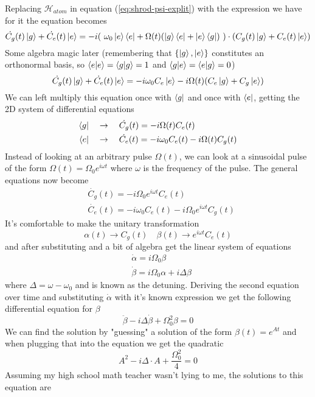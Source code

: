 Replacing $\mathcal{H}_{atom}$ in equation  (\ref{eq:shrod-psi-explit}) with the expression we have for it the equation becomes
\[
    \dot{C_g} (t) \ket{g} + \dot{C_e} (t) \ket{e} = -i  (\ \omega_0\ket{e}\bra{e} + \Omega (t) (\ket{g}\bra{e} + \ket{e}\bra{g})\ )\cdot  (C_g (t) \ket{g} + C_e (t) \ket{e})
\]
Some algebra magic later (remembering that $\{\ket{g},\ket{e}\}$ constitutes an orthonormal basis, so $\braket{e}{e} = \braket{g}{g} = 1$ and $\braket{g}{e} = \braket{e}{g} = 0$)
\[
    \dot{C_g} (t) \ket{g} + \dot{C_e} (t) \ket{e} = -i \omega_0 C_e \ket{e} - i\Omega (t) (C_e\ket{g} + C_g \ket{e})
\]
We can left multiply this equation once with $\bra{g}$ and once with $\bra{e}$, getting the 2D system of differential equations
\begin{align*}
    \bra{g} \quad &\rightarrow \quad \dot{C_g} (t) = -i \Omega (t)C_e (t) \\
    \bra{e} \quad &\rightarrow \quad \dot{C_e} (t) = -i \omega_0 C_e (t) - i\Omega (t) C_g (t)
\end{align*} 
Instead of looking at an arbitrary pulse $\Omega  (t)$, we can look at a sinusoidal pulse of the form $\Omega  (t) = \Omega_0 e^{i\omega t}$ where $\omega$ is the frequency of the pulse. The general equations now become
\begin{align*}
    &\dot{C_g} (t) = -i \Omega_0 e^{i\omega t}C_e (t) \\
    &\dot{C_e} (t) = -i \omega_0 C_e (t) - i \Omega_0 e^{i\omega t} C_g (t)
\end{align*}
It's comfortable to make the unitary transformation
\[
    \alpha (t) \rightarrow C_g (t) \quad \beta (t) \rightarrow e^{i \omega t} C_e (t)
\]
and after substituting and a bit of algebra get the linear system of equations
\begin{align*}
    &\dot{\alpha} = i \Omega_0 \beta \\
    &\dot{\beta} = i \Omega_0 \alpha + i \Delta \beta
\end{align*}
where $\Delta = \omega - \omega_0$ and is known as the detuning. Deriving the second equation over time and substituting $\dot{\alpha}$ with it's known expression we get the following differential equation for $\beta$
\[
    \ddot{\beta} - i \Delta \dot{\beta} + \Omega_0^2\beta = 0
\]
We can find the solution by "guessing" a solution of the form $\beta (t) = e^{A t}$ and when plugging that into the equation we get the quadratic
\[
    A^2 - i \Delta \cdot A + \frac{\Omega_0^2}{4} = 0
\]
Assuming my high school math teacher wasn't lying to me, the solutions to this equation are
